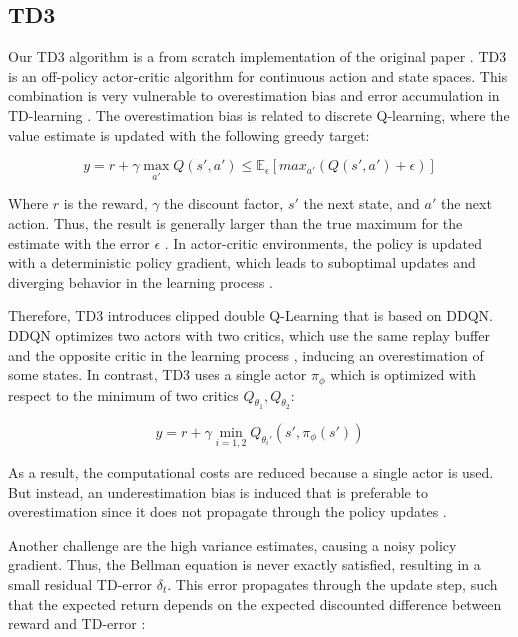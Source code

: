 \subsection{\acl{TD3}}\label{sec:td3}
Our \ac{TD3} algorithm is a from scratch implementation of the original paper \cite{fujimoto2018:TD3}. \ac{TD3} is an off-policy actor-critic algorithm for continuous action and state spaces. This combination is very vulnerable to overestimation bias and error accumulation in \ac{TD}-learning \cite{fujimoto2018:TD3}. The overestimation bias is related to discrete Q-learning, where the value estimate is updated with the following greedy target:

\begin{equation}
    y = r + \gamma \max_{a'} Q(s', a') \leq \mathbb{E}_\epsilon \left[max_{a'} (Q(s', a') + \epsilon)\right]
\end{equation}

Where $r$ is the reward, $\gamma$ the discount factor, $s'$ the next state, and $a'$ the next action. Thus, the result is generally larger than the true maximum for the estimate with the error $\epsilon$ \cite{thrun2014issuesQlearning}. In  actor-critic environments, the policy is updated with a deterministic policy gradient, which leads to suboptimal updates and diverging behavior in the learning process \cite{fujimoto2018:TD3}.

Therefore, \ac{TD3} introduces clipped double Q-Learning that is based on \ac{DDQN}. \ac{DDQN} optimizes two actors with two critics, which use the same replay buffer and the opposite critic in the learning process \cite{wang2016:DDQN}, inducing an overestimation of some states. In contrast, \ac{TD3} uses a single actor $\pi_\phi$ which is optimized with respect to the minimum of two critics $Q_{\theta_1}, Q_{\theta_2}$:

\begin{equation}
    y = r + \gamma \min_{i=1,2} Q_{\theta_i'}(s', \pi_\phi(s'))
\end{equation}

As a result, the computational costs are reduced because a single actor  is used. But instead, an underestimation bias is induced that is preferable to overestimation since it does not propagate through the policy updates \cite{fujimoto2018:TD3}.

Another challenge are the high variance estimates, causing a noisy policy gradient. Thus, the Bellman equation is never exactly satisfied, resulting in a small residual \ac{TD}-error $\delta_t$. This error propagates through the update step, such that the expected return depends on the expected discounted difference between reward and \ac{TD}-error \cite{fujimoto2018:TD3}:

